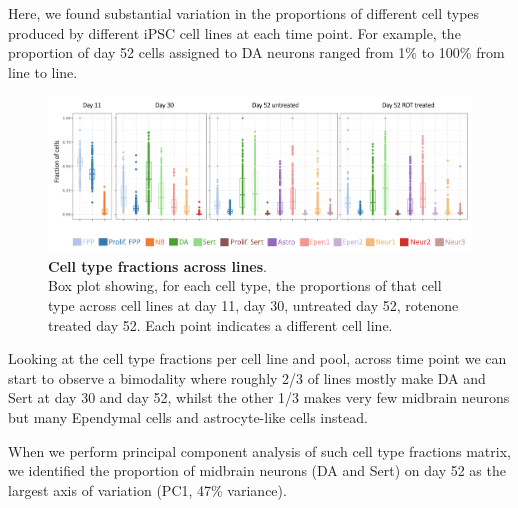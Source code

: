 Here, we found substantial variation in the proportions of different cell types produced by different iPSC cell lines at each time point. 
For example, the proportion of day 52 cells assigned to DA neurons ranged from 1\% to 100\% from line to line. 

\begin{figure}[h]
\centering
\includegraphics[width=15cm]{Chapter5/Fig/neuroseq_line_celltype.png}
\caption[Cell type fractions across lines]{\textbf{Cell type fractions across lines}.\\
Box plot showing, for each cell type, the proportions of that cell type across cell lines at day 11, day 30, untreated day 52, rotenone treated day 52. 
Each point indicates a different cell line.}
\label{fig:neuroseq_line_variation}
\end{figure}

Looking at the cell type fractions per cell line and pool, across time point we can start to observe a bimodality where roughly 2/3 of lines mostly make DA and Sert at day 30 and day 52, whilst the other 1/3 makes very few midbrain neurons but many Ependymal cells and astrocyte-like cells instead.

When we perform principal component analysis of such cell type fractions matrix, we identified the proportion of midbrain neurons (DA and Sert) on day 52 as the largest axis of variation (PC1, 47\% variance). 

